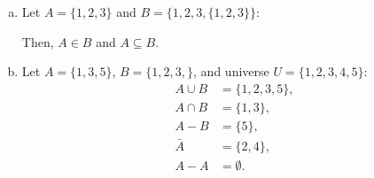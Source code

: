 \documentclass[12pt,letterpaper]{article}
\begin{document}
\begin{enumerate}[a)]
\begin{enumerate}[1.]
        \item 
        $\therefore n^2$ is an odd integer. $\qed$
    \end{enumerate}
    
    

    \item Let $A = \{1,2,3\}$ and $B = \{1,2,3,\{1,2,3\}\}$:
    
    Then, $A \in B$ and $A \subseteq B$.
    
    \item Let $A = \{1, 3, 5\}$, $B = \{1,2,3,\}$, and universe $U = \{1,2,3,4,5\}$:
    \begin{align*}
        A \cup B    &= \{1,2,3,5\}, \\
        A \cap B    &= \{1,3\}, \\
        A - B       &= \{5\},\\
        \bar{A}     &= \{2,4\},\\
        A - A       &= \emptyset .
    \end{align*}

\end{enumerate}
\end{document}
